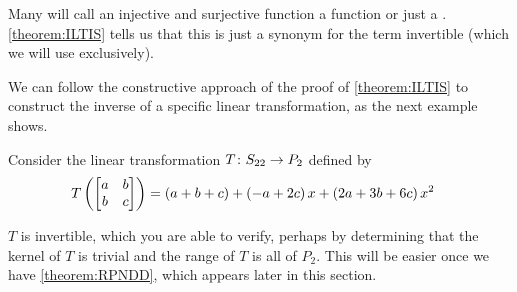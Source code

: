 \documentclass{ximera}
\begin{document}
Many will call an injective and surjective function a  function or just a .  \ref{theorem:ILTIS} tells us that this is just a synonym for the term invertible (which we will use exclusively).



We can follow the constructive approach of the proof of \ref{theorem:ILTIS} to construct the inverse of a specific linear transformation, as the next example shows.



\begin{example}

Consider the linear transformation  $T\colon S_{22}\rightarrow P_2$ defined by
\begin{align*}
T\left(\begin{bmatrix}a&b\\b&c\end{bmatrix}\right)
&=
\left(a+b+c\right)
+
\left(-a+2c\right)x
+
\left(2a+3b+6c\right)x^2
\end{align*}



$T$ is invertible, which you are able to verify, perhaps by determining that the kernel of $T$ is trivial and the range of $T$ is all of $P_2$.  This will be easier once we have \ref{theorem:RPNDD}, which appears later in this section.




\end{example}
\end{document}
